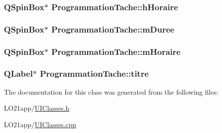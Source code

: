 \subsubsection[{h\+Horaire}]{\setlength{\rightskip}{0pt plus 5cm}Q\+Spin\+Box$\ast$ Programmation\+Tache\+::h\+Horaire}\label{class_programmation_tache_a19daaa27a4939dd499b80f57ed84a1fe}
\hypertarget{class_programmation_tache_a0761dfd09ef37d029a8d38f2db32d69d}{}
\subsubsection[{m\+Duree}]{\setlength{\rightskip}{0pt plus 5cm}Q\+Spin\+Box$\ast$ Programmation\+Tache\+::m\+Duree}\label{class_programmation_tache_a0761dfd09ef37d029a8d38f2db32d69d}
\hypertarget{class_programmation_tache_a2d966e73c014f058565681c5e75e4894}{}
\subsubsection[{m\+Horaire}]{\setlength{\rightskip}{0pt plus 5cm}Q\+Spin\+Box$\ast$ Programmation\+Tache\+::m\+Horaire}\label{class_programmation_tache_a2d966e73c014f058565681c5e75e4894}
\hypertarget{class_programmation_tache_a6eea8febad907f0705eb3a9e8cc3fbde}{}
\subsubsection[{titre}]{\setlength{\rightskip}{0pt plus 5cm}Q\+Label$\ast$ Programmation\+Tache\+::titre}\label{class_programmation_tache_a6eea8febad907f0705eb3a9e8cc3fbde}


The documentation for this class was generated from the following files\+:\begin{DoxyCompactItemize}
\item 
L\+O21app/\hyperlink{_u_i_classes_8h}{U\+I\+Classes.\+h}\item 
L\+O21app/\hyperlink{_u_i_classes_8cpp}{U\+I\+Classes.\+cpp}\end{DoxyCompactItemize}
